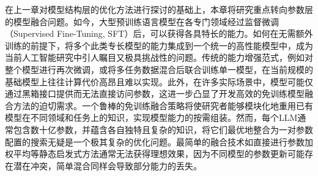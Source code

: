 \documentclass[../main.tex]{subfiles}
\begin{document}

\label{sec:ch5-1-introduction}

在上一章对模型结构层的优化方法进行探讨的基础上，本章将研究重点转向参数层的模型融合问题。如今，大型预训练语言模型在各专门领域经过监督微调（Supervised Fine-Tuning, SFT）后，可以获得各具特长的能力。如何在无需额外训练的前提下，将多个此类专长模型的能力集成到一个统一的高性能模型中，成为当前人工智能研究中引人瞩目又极具挑战性的问题。传统的能力增强范式，例如对整个模型进行再次微调，或将多任务数据混合后联合训练单一模型，在当前规模的基础模型上往往计算代价高昂且难以实现。此外，在许多实际场景中，模型可能仅通过黑箱接口提供而无法直接访问参数，这进一步凸显了开发高效的免训练模型融合方法的迫切需求。一个鲁棒的免训练融合策略将使研究者能够模块化地重用已有模型在不同领域和任务上的知识，实现模型能力的按需组装。然而，每个LLM通常包含数十亿参数，并蕴含各自独特且复杂的知识，将它们最优地整合为一对参数配置的搜索无疑是一个极其复杂的优化问题。最简单的融合技术如直接进行参数加权平均等静态启发式方法通常无法获得理想效果，因为不同模型的参数更新可能存在潜在冲突，简单混合同样会导致部分能力的丢失。
\end{document}
